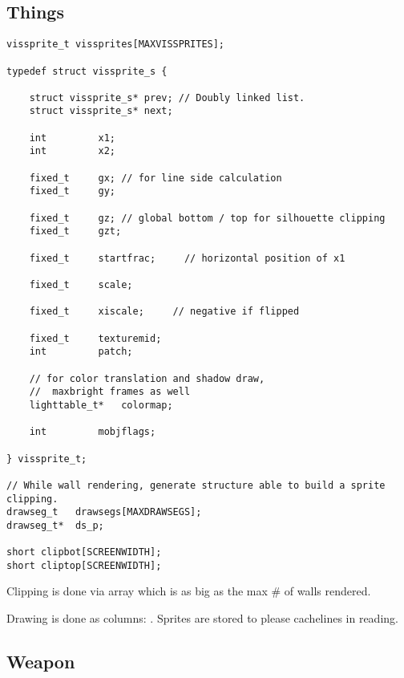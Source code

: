 \subsection{Things}
\begin{verbatim}
vissprite_t	vissprites[MAXVISSPRITES];

typedef struct vissprite_s {
    
    struct vissprite_s*	prev; // Doubly linked list.
    struct vissprite_s*	next;
    
    int			x1;
    int			x2;
    
    fixed_t		gx; // for line side calculation
    fixed_t		gy;		

    fixed_t		gz; // global bottom / top for silhouette clipping
    fixed_t		gzt;

    fixed_t		startfrac;     // horizontal position of x1
    
    fixed_t		scale;
        
    fixed_t		xiscale;	 // negative if flipped

    fixed_t		texturemid;
    int			patch;

    // for color translation and shadow draw,
    //  maxbright frames as well
    lighttable_t*	colormap;
   
    int			mobjflags;
    
} vissprite_t;

// While wall rendering, generate structure able to build a sprite clipping.
drawseg_t	drawsegs[MAXDRAWSEGS];
drawseg_t*	ds_p;

short clipbot[SCREENWIDTH];
short cliptop[SCREENWIDTH];

\end{verbatim}

Clipping is done via  array which is as big as the max \# of walls rendered.\\
\par
Drawing is done as columns: . Sprites are stored to please cachelines in reading.







\subsection{Weapon}

